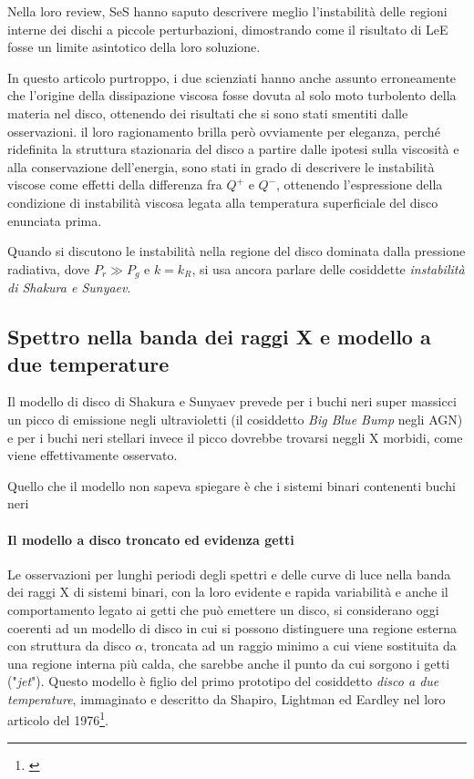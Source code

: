 \documentclass[a4paperbi]{article}
\begin{document}
	 Nella loro review, SeS hanno saputo descrivere meglio l'instabilità delle regioni interne dei dischi a piccole perturbazioni, dimostrando come il risultato di LeE fosse un limite asintotico della loro soluzione. 
	 
	 In questo articolo purtroppo, i due scienziati hanno anche assunto erroneamente che l'origine della dissipazione viscosa fosse dovuta al solo moto turbolento della materia nel disco, ottenendo dei risultati che si sono stati smentiti dalle osservazioni. il loro ragionamento brilla però ovviamente per eleganza, perché ridefinita la struttura stazionaria del disco a partire dalle ipotesi sulla viscosità e alla conservazione dell'energia, sono stati in grado di descrivere le instabilità viscose come effetti della differenza fra $Q^+$ e $Q^-$, ottenendo l'espressione della condizione di instabilità viscosa legata alla temperatura superficiale del disco enunciata prima.
	 
	 Quando si discutono le instabilità nella regione del disco dominata dalla pressione radiativa, dove $P_r\gg P_g$ e $k=k_R$, si usa ancora parlare delle cosiddette \textit{instabilità di Shakura e Sunyaev}.
	 
	 \subsection{Spettro nella banda dei raggi X e modello a due temperature}	
	Il modello di disco di Shakura e Sunyaev prevede per i buchi neri super massicci un picco di emissione negli ultravioletti (il cosiddetto \textit{Big Blue Bump} negli AGN) e per i buchi neri stellari invece il picco dovrebbe trovarsi neggli X morbidi, come viene effettivamente osservato.
	
	Quello che il modello non sapeva spiegare è che i sistemi binari contenenti buchi neri
	
	\paragraph{Il modello a disco troncato ed evidenza getti}
	Le osservazioni per lunghi periodi degli spettri e delle curve di luce nella banda dei raggi X di sistemi binari, con la loro evidente e rapida variabilità e anche il comportamento legato ai getti che può emettere un disco, si considerano oggi coerenti ad un modello di disco in cui si possono distinguere una regione esterna con struttura da disco $\alpha$, troncata ad un raggio minimo a cui viene sostituita da una regione interna più calda, che sarebbe anche il punto da cui sorgono i getti ("\textit{jet}"). Questo modello è figlio del primo prototipo del cosiddetto \textit{disco a due temperature}, immaginato e descritto da Shapiro, Lightman ed Eardley nel loro articolo del 1976\footnote{\cite{ShapiroLightmanEardley1976}}.
	
\end{document}
